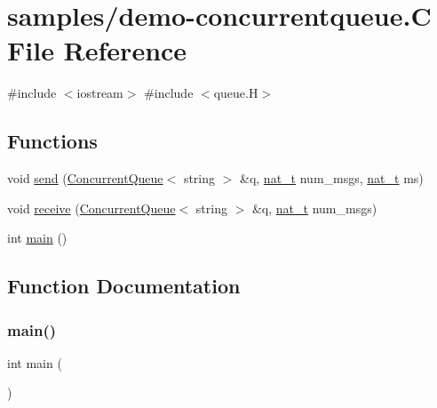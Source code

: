 \hypertarget{demo-concurrentqueue_8_c}{}\section{samples/demo-\/concurrentqueue.C File Reference}
\label{demo-concurrentqueue_8_c}
{\ttfamily \#include $<$iostream$>$}\newline
{\ttfamily \#include $<$queue.\+H$>$}\newline
\subsection*{Functions}
\begin{DoxyCompactItemize}
\item 
void \hyperlink{demo-concurrentqueue_8_c_aa97d75998c4e7c6e867a476cb2ac4fba}{send} (\hyperlink{class_designar_1_1_concurrent_queue}{Concurrent\+Queue}$<$ string $>$ \&q, \hyperlink{namespace_designar_aa72662848b9f4815e7bf31a7cf3e33d1}{nat\+\_\+t} num\+\_\+msgs, \hyperlink{namespace_designar_aa72662848b9f4815e7bf31a7cf3e33d1}{nat\+\_\+t} ms)
\item 
void \hyperlink{demo-concurrentqueue_8_c_ab141b5e3494a69e30757648ece395552}{receive} (\hyperlink{class_designar_1_1_concurrent_queue}{Concurrent\+Queue}$<$ string $>$ \&q, \hyperlink{namespace_designar_aa72662848b9f4815e7bf31a7cf3e33d1}{nat\+\_\+t} num\+\_\+msgs)
\item 
int \hyperlink{demo-concurrentqueue_8_c_ae66f6b31b5ad750f1fe042a706a4e3d4}{main} ()
\end{DoxyCompactItemize}


\subsection{Function Documentation}
\mbox{\label{demo-concurrentqueue_8_c_ae66f6b31b5ad750f1fe042a706a4e3d4}} 
\subsubsection{\texorpdfstring{main()}{main()}}
{\footnotesize\ttfamily int main (\begin{DoxyParamCaption}{ }\end{DoxyParamCaption})}



